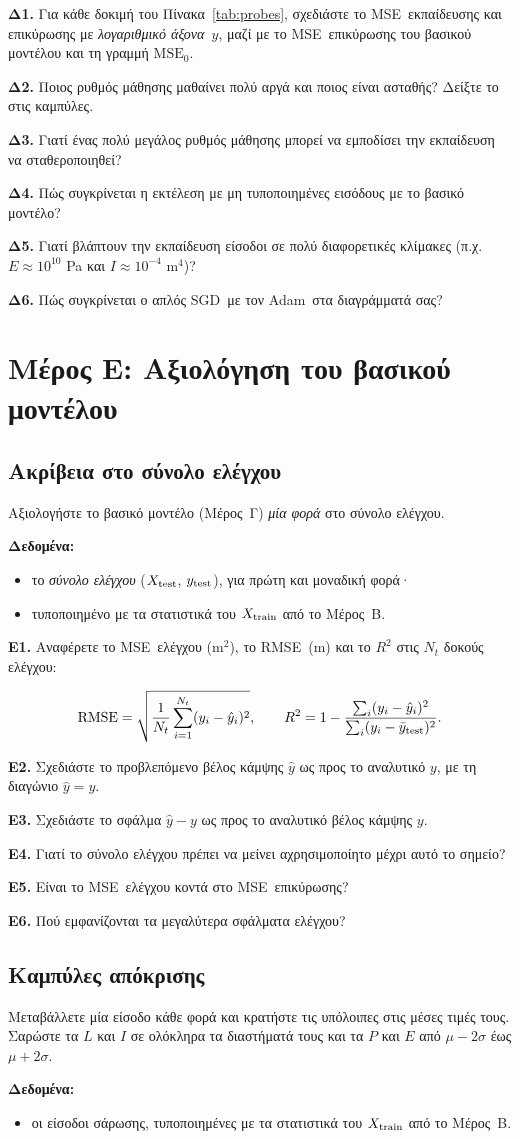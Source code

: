 \documentclass[11pt]{article}
\newcommand{\question}[2]{\par\noindent\textbf{#1.} #2\par}
\newcommand{\datause}[1]{\par\smallskip\needspace{4\baselineskip}\noindent\textbf{Δεδομένα:}\nopagebreak\begin{itemize}#1\end{itemize}}
\newcommand{\unit}[1]{\textlatin{#1}}
\newcommand{\MSE}{\textlatin{MSE}}
\newcommand{\RMSE}{\textlatin{RMSE}}
\newcommand{\Adam}{\textlatin{Adam}}
\newcommand{\SGD}{\textlatin{SGD}}
\begin{document}
\question{Δ1}{Για κάθε δοκιμή του Πίνακα~\ref{tab:probes}, σχεδιάστε το \MSE\ εκπαίδευσης και επικύρωσης με \emph{λογαριθμικό άξονα~$y$}, μαζί με το \MSE\ επικύρωσης του βασικού μοντέλου και τη γραμμή $\mathrm{MSE}_0$.}
\question{Δ2}{Ποιος ρυθμός μάθησης μαθαίνει πολύ αργά και ποιος είναι ασταθής? Δείξτε το στις καμπύλες.}
\question{Δ3}{Γιατί ένας πολύ μεγάλος ρυθμός μάθησης μπορεί να εμποδίσει την εκπαίδευση να σταθεροποιηθεί?}
\question{Δ4}{Πώς συγκρίνεται η εκτέλεση με μη τυποποιημένες εισόδους με το βασικό μοντέλο?}
\question{Δ5}{Γιατί βλάπτουν την εκπαίδευση είσοδοι σε πολύ διαφορετικές κλίμακες (π.χ.\ $E\approx10^{10}$ \unit{Pa} και $I\approx10^{-4}$ \unit{m}$^4$)?}
\question{Δ6}{Πώς συγκρίνεται ο απλός \SGD\ με τον \Adam\ στα διαγράμματά σας?}

\section*{Μέρος Ε: Αξιολόγηση του βασικού μοντέλου}
\subsection*{Ακρίβεια στο σύνολο ελέγχου}
\aitrap Αξιολογήστε το βασικό μοντέλο (Μέρος~Γ) \emph{μία φορά} στο σύνολο ελέγχου.
\datause{
  \item το \emph{σύνολο ελέγχου} ($X_{\rm test}$, $y_{\rm test}$), για πρώτη και μοναδική φορά·
  \item τυποποιημένο με τα στατιστικά του $X_{\rm train}$ από το Μέρος~Β.}

\question{Ε1}{Αναφέρετε το \MSE\ ελέγχου (\unit{m}$^2$), το \RMSE\ (\unit{m}) και το $R^2$ στις $N_t$ δοκούς ελέγχου:}
\[
\operatorname{RMSE}=\sqrt{\frac{1}{N_t}\sum_{i=1}^{N_t}(y_i-\hat y_i)^2},\qquad
R^2=1-\frac{\sum_i(y_i-\hat y_i)^2}{\sum_i(y_i-\bar y_{\rm test})^2}.
\]
\question{Ε2}{Σχεδιάστε το προβλεπόμενο βέλος κάμψης $\hat y$ ως προς το αναλυτικό $y$, με τη διαγώνιο $\hat y=y$.}
\question{Ε3}{Σχεδιάστε το σφάλμα $\hat y-y$ ως προς το αναλυτικό βέλος κάμψης $y$.}

\question{Ε4}{Γιατί το σύνολο ελέγχου πρέπει να μείνει αχρησιμοποίητο μέχρι αυτό το σημείο?}
\question{Ε5}{Είναι το \MSE\ ελέγχου κοντά στο \MSE\ επικύρωσης?}
\question{Ε6}{Πού εμφανίζονται τα μεγαλύτερα σφάλματα ελέγχου?}

\subsection*{Καμπύλες απόκρισης}
Μεταβάλλετε μία είσοδο κάθε φορά και κρατήστε τις υπόλοιπες στις μέσες τιμές τους. Σαρώστε τα $L$ και $I$ σε ολόκληρα τα διαστήματά τους και τα $P$ και $E$ από $\mu-2\sigma$ έως $\mu+2\sigma$.
\datause{\item οι είσοδοι σάρωσης, τυποποιημένες με τα στατιστικά του $X_{\rm train}$ από το Μέρος~Β.}
\end{document}

